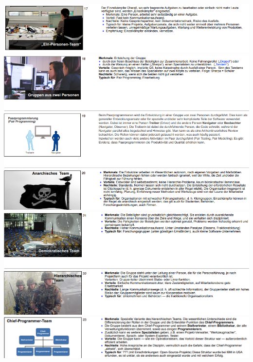 \documentclass{article}
\begin{document}
	\includegraphics[scale=1.1]{media/Organisationsformen0.png}
	\includegraphics[scale=1.1]{media/Organisationsformen1.png}
	\includegraphics[scale=1.1]{media/Organisationsformen2.png}
	\includegraphics[scale=1.5]{media/Organisationsformen3.png}
	
\end{document}
